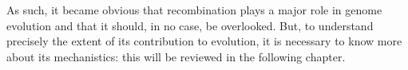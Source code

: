 %
As such, it became obvious that recombination plays a major role in genome evolution and that it should, in no case, be overlooked.
But, to understand precisely the extent of its contribution to evolution, it is necessary to know more about its mechanistics: this will be reviewed in the following chapter.


%
%
%
%
%
%
%








